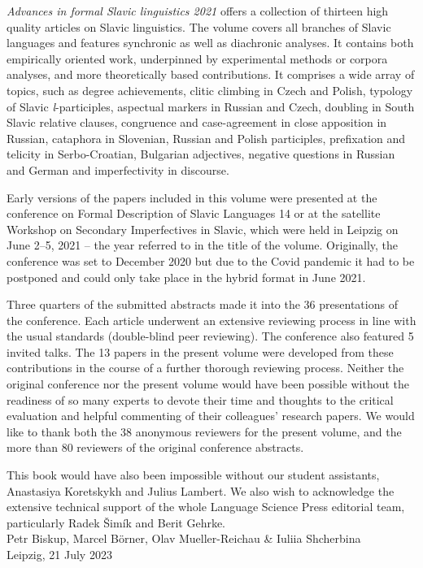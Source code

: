 \begin{refsection}
\textit{Advances in formal Slavic linguistics 2021} offers a collection of thirteen high quality articles on Slavic linguistics. The volume covers all branches of Slavic languages and features synchronic as well as diachronic analyses. It contains both empirically oriented work, underpinned by experimental methods or corpora analyses, and more theoretically based contributions. It comprises a wide array of topics, such as degree achievements, clitic climbing in Czech and Polish, typology of Slavic \textit{l}-participles, aspectual markers in Russian and Czech, doubling in South Slavic relative clauses, congruence and case-agreement in close apposition in Russian, cataphora in Slovenian, Russian and Polish participles, prefixation and telicity in Serbo-Croatian, Bulgarian adjectives, negative questions in Russian and German and imperfectivity in discourse.\largerpage[2.5]

Early versions of the papers included in this volume were presented at the conference on Formal Description of Slavic Languages 14 or at the satellite Workshop on Secondary Imperfectives in Slavic, which were held in Leipzig on June 2--5, 2021 -- the year referred to in the title of the volume. Originally, the conference was set to December 2020 but due to the Covid pandemic it had to be postponed and could only take place in the hybrid format in June 2021.

Three quarters of the submitted abstracts made it into the 36 presentations of the conference. Each article underwent an extensive reviewing process in line with the usual standards (double-blind peer reviewing). The conference also featured 5 invited talks. The 13 papers in the present volume were developed from these contributions in the course of a further thorough reviewing process. Neither the original conference nor the present volume would have been possible without the readiness of so many experts to devote their time and thoughts to the critical evaluation and helpful commenting of their colleagues’ research papers. We would like to thank both the 38 anonymous reviewers for the present volume, and the more than 80 reviewers of the original conference abstracts.

This book would have also been impossible without our student assistants, Anastasiya Koretskykh and Julius Lambert. We also wish to acknowledge the extensive technical support of the whole Language Science Press editorial team, particularly Radek Šimík and Berit Gehrke.\bigskip\\
Petr Biskup, Marcel Börner, Olav Mueller-Reichau \& Iuliia Shcherbina\\
Leipzig, 21 July 2023
\end{refsection}

